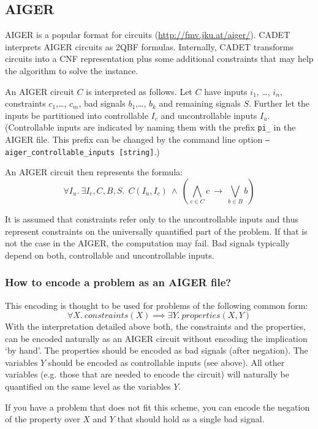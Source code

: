 \documentclass{article}
\begin{document}
\subsection{AIGER}

AIGER is a popular format for circuits (\url{http://fmv.jku.at/aiger/}).
CADET interprets AIGER circuits as 2QBF formulas. 
Internally, CADET transforms circuits into a CNF representation plus some additional constraints that may help the algorithm to solve the instance. 

An AIGER circuit $C$ is interpreted as follows.
Let $C$ have inputs $i_1$, \dots, $i_n$, constraints $c_1$,\dots, $c_m$, bad signals $b_1$,\dots, $b_k$ and remaining signals $S$. 
Further let the inputs be partitioned into controllable $I_c$ and uncontrollable inputs $I_u$. 
(Controllable inputs are indicated by naming them with the prefix \texttt{pi\_} in the AIGER file. 
This prefix can be changed by the command line option \texttt{--aiger\_controllable\_inputs [string]}.)

An AIGER circuit then represents the formula: 
\[
\forall I_u.~\exists I_c, C, B, S.~~ C(I_u,I_c) ~\wedge~ \left(\bigwedge_{c\in C} c ~\rightarrow~ \bigvee_{b\in B} b\right)
\]

It is assumed that constraints refer only to the uncontrollable inputs and thus represent constraints on the universally quantified part of the problem. 
If that is not the case in the AIGER, the computation may fail.
Bad signals typically depend on both, controllable and uncontrollable inputs. 

\subsubsection{How to encode a problem as an AIGER file?}
This encoding is thought to be used for problems of the following common form: 
\[
\forall X.~ \mathit{constraints}(X) \implies \exists Y.~ \mathit{properties}(X,Y)
\]
With the interpretation detailed above both, the constraints and the properties, can be encoded naturally as an AIGER circuit without encoding the implication `by hand'. 
The properties should be encoded as bad signals (after negation).
The variables $Y$ should be encoded as controllable inputs (see above). 
All other variables (e.g. those that are needed to encode the circuit) will naturally be quantified on the same level as the variables $Y$.

If you have a problem that does not fit this scheme, you can encode the negation of the property over $X$ and $Y$ that should hold as a single bad signal.
\end{document}
